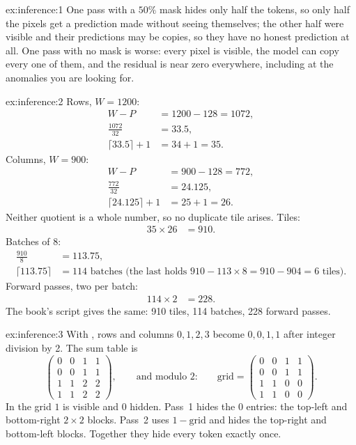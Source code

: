 
\begin{solution}{ex:inference:1}
One pass with a $50\%$ mask hides only half the tokens, so only half the pixels get a prediction made
without seeing themselves; the other half were visible and their predictions may be copies, so they have no
honest prediction at all. One pass with no mask is worse: every pixel is visible, the model can copy every
one of them, and the residual is near zero everywhere, including at the anomalies you are looking for.
\end{solution}

\begin{solution}{ex:inference:2}
Rows, $W=1200$:
\begin{align*}
W-P &= 1200-128 = 1072,\\
\frac{1072}{32} &= 33.5,\\
\lceil 33.5\rceil+1 &= 34+1 = 35.
\end{align*}
Columns, $W=900$:
\begin{align*}
W-P &= 900-128 = 772,\\
\frac{772}{32} &= 24.125,\\
\lceil 24.125\rceil+1 &= 25+1 = 26.
\end{align*}
Neither quotient is a whole number, so no duplicate tile arises. Tiles:
\begin{align*}
35\times26 &= 910.
\end{align*}
Batches of 8:
\begin{align*}
\frac{910}{8} &= 113.75,\\
\lceil113.75\rceil &= 114 \text{ batches (the last holds } 910-113\times8 = 910-904 = 6 \text{ tiles)}.
\end{align*}
Forward passes, two per batch:
\begin{align*}
114\times2 &= 228.
\end{align*}
The book's script gives the same: 910 tiles, 114 batches, 228 forward passes.
\end{solution}

\begin{solution}{ex:inference:3}
With , rows and columns $0,1,2,3$ become $0,0,1,1$ after integer division by 2. The sum
table is
\[
\begin{pmatrix}0&0&1&1\\0&0&1&1\\1&1&2&2\\1&1&2&2\end{pmatrix},
\qquad\text{and modulo 2:}\qquad
\text{grid}=\begin{pmatrix}0&0&1&1\\0&0&1&1\\1&1&0&0\\1&1&0&0\end{pmatrix}.
\]
In the grid $1$ is visible and $0$ hidden. Pass~1 hides the $0$ entries: the top-left and bottom-right
$2\times2$ blocks. Pass~2 uses $1-\text{grid}$ and hides the top-right and bottom-left blocks. Together they
hide every token exactly once.
\end{solution}

